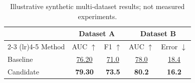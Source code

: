 \begin{table}[t]
\centering
\caption{Illustrative synthetic multi-dataset results; not measured experiments.}
\label{tab:multi-dataset}
\begin{tabular}{@{}lcccc@{}}
\toprule
 & \multicolumn{2}{c}{Dataset A} & \multicolumn{2}{c}{Dataset B} \\
\cmidrule(lr){2-3} \cmidrule(lr){4-5}
Method & AUC $\uparrow$ & F1 $\uparrow$ & AUC $\uparrow$ & Error $\downarrow$ \\
\midrule
Baseline & \underline{76.20} & \underline{71.0} & \underline{78.0} & \underline{18.4} \\
Candidate & \textbf{79.30} & \textbf{73.5} & \textbf{80.2} & \textbf{16.2} \\
\bottomrule
\end{tabular}
\end{table}
